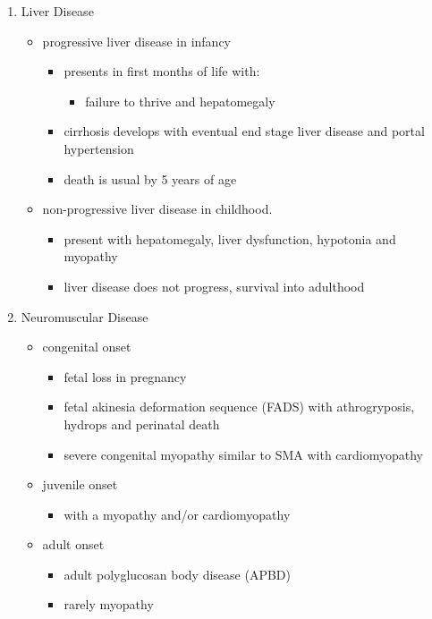 \documentclass{scrartcl}
\begin{document}
\begin{enumerate}
\item Liver Disease
\label{sec:orge0fc1eb}
\begin{itemize}
\item progressive liver disease in infancy
\begin{itemize}
\item presents in first months of life with:
\begin{itemize}
\item failure to thrive and hepatomegaly
\end{itemize}
\item cirrhosis develops with eventual end stage liver disease and
portal hypertension
\item death is usual by 5 years of age
\end{itemize}
\item non-progressive liver disease in childhood.
\begin{itemize}
\item present with hepatomegaly, liver dysfunction, hypotonia and
myopathy
\item liver disease does not progress, survival into adulthood
\end{itemize}
\end{itemize}

\item Neuromuscular Disease
\label{sec:org917b4b8}
\begin{itemize}
\item congenital onset
\begin{itemize}
\item fetal loss in pregnancy
\item fetal akinesia deformation sequence (FADS) with athrogryposis, hydrops and perinatal death
\item severe congenital myopathy similar to SMA with \textpm{} cardiomyopathy
\end{itemize}
\item juvenile onset
\begin{itemize}
\item with a myopathy and/or cardiomyopathy
\end{itemize}
\item adult onset
\begin{itemize}
\item adult polyglucosan body disease (APBD)
\item rarely myopathy
\end{itemize}
\end{itemize}
\end{enumerate}
\end{document}
